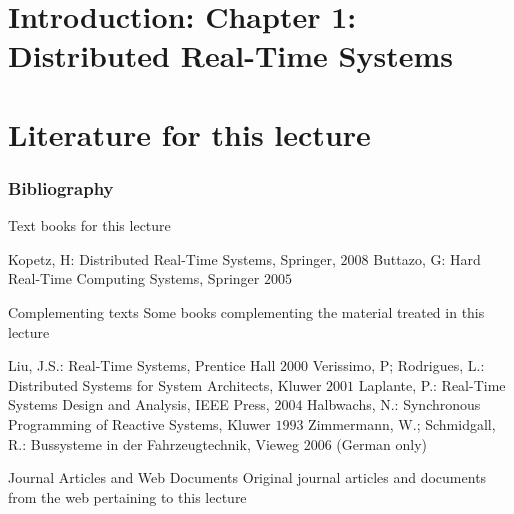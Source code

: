 \section{Introduction: Chapter 1: Distributed Real-Time Systems}


\section{Literature for this lecture}\label{literature-for-this-lecture}

\begin{frame}
    \frametitle{Bibliography}
\tiny
	Text books for this lecture\\
\vspace*{1ex}

  \begin{thebibliography}{9}

  \beamertemplatearticlebibitems

    Kopetz, H: Distributed Real-Time Systems, Springer, $2008$
    Buttazo, G: Hard Real-Time Computing Systems, Springer $2005$
  \end{thebibliography}

\vspace*{2ex}
Complementing texts
Some books complementing the material treated in this lecture

\vspace*{1ex}

  \begin{thebibliography}{9}
  \beamertemplatearticlebibitems

Liu, J.S.:	Real-Time Systems, Prentice Hall $2000$
Verissimo, P; Rodrigues, L.: 	Distributed Systems for System Architects,
Kluwer $2001$
Laplante, P.:	Real-Time Systems Design and Analysis, IEEE Press, $2004$
Halbwachs, N.:	Synchronous Programming of Reactive Systems, Kluwer $1993$
Zimmermann, W.; Schmidgall, R.:	Bussysteme in der Fahrzeugtechnik, Vieweg
$2006$ (German only)

  \end{thebibliography}

\vspace*{2ex}

Journal Articles and Web Documents
Original journal articles and documents from the web pertaining to this lecture


\end{frame}

